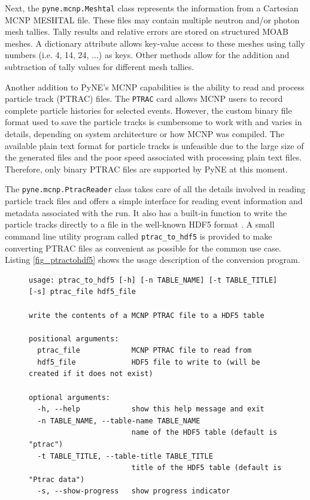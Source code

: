 \documentclass{ansconf}
\begin{document}
Next, the \texttt{pyne.mcnp.Meshtal} class represents the information from a 
Cartesian MCNP MESHTAL file. These files may contain multiple neutron and/or 
photon mesh
tallies.  Tally results and relative errors are stored on structured MOAB
meshes. A dictionary attribute allows key-value access to these meshes using
tally numbers (i.e. 4, 14, 24, ...) as keys. Other methods allow for the
addition and subtraction of tally values for different mesh tallies.

Another addition to PyNE's MCNP capabilities is the ability to read and
process particle track (PTRAC) files. The \texttt{PTRAC} card allows MCNP
users to record complete particle histories for selected events. However,
the custom binary file format used to save the particle tracks is cumbersome
to work with and varies in details, depending on system architecture or
how MCNP was compiled. The available plain text format for particle
tracks is unfeasible due to the large size of the generated files and the
poor speed associated with processing plain text files. Therefore, only
binary PTRAC files are supported by PyNE at this moment.

The \texttt{pyne.mcnp.PtracReader} class takes care of all the details
involved in reading particle track files and offers a simple interface
for reading event information and metadata associated with the run.
It also has a built-in function to write the particle tracks directly
to a file in the well-known HDF5 format \cite{hdf5}.
A small command line utility program called \texttt{ptrac\_to\_hdf5} is
provided to make converting PTRAC files as convenient as possible
for the common use case. Listing \ref{fig_ptractohdf5} shows the usage
description of the conversion program.

\begin{figure}[htbp]
\begin{lstlisting}[frame=single,basicstyle=\scriptsize,label=fig_ptractohdf5,caption=Usage description of the PTRAC to HDF5 command line utility.]
usage: ptrac_to_hdf5 [-h] [-n TABLE_NAME] [-t TABLE_TITLE] [-s] ptrac_file hdf5_file

write the contents of a MCNP PTRAC file to a HDF5 table

positional arguments:
  ptrac_file            MCNP PTRAC file to read from
  hdf5_file             HDF5 file to write to (will be created if it does not exist)

optional arguments:
  -h, --help            show this help message and exit
  -n TABLE_NAME, --table-name TABLE_NAME
                        name of the HDF5 table (default is "ptrac")
  -t TABLE_TITLE, --table-title TABLE_TITLE
                        title of the HDF5 table (default is "Ptrac data")
  -s, --show-progress   show progress indicator
\end{lstlisting}
\end{figure}
\end{document}
